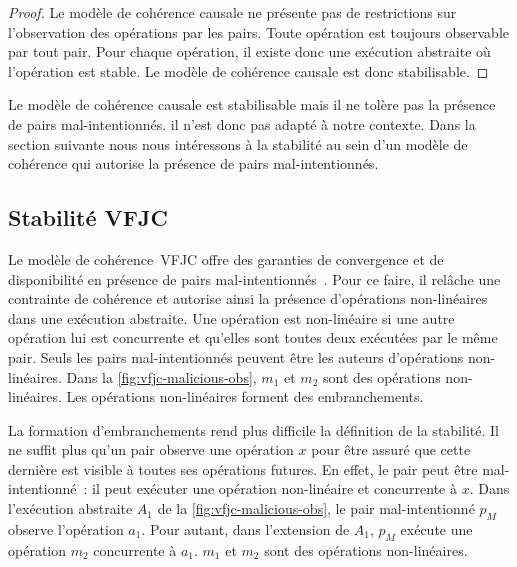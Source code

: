 \begin{proof}
Le modèle de cohérence causale ne présente pas de restrictions sur l'observation des opérations par les pairs.
Toute opération est toujours observable par tout pair.
Pour chaque opération, il existe donc une exécution abstraite où l'opération est stable.
Le modèle de cohérence causale est donc stabilisable.
\end{proof}

Le modèle de cohérence causale est stabilisable mais il ne tolère pas la présence de pairs mal-intentionnés.
il n'est donc pas adapté à notre contexte.
Dans la section suivante nous nous intéressons à la stabilité au sein d'un modèle de cohérence qui autorise la présence de pairs mal-intentionnés.


\subsection{Stabilité \acl{VFJC}}\label{subsec:vfjcs}

Le modèle de cohérence~\acf{VFJC} offre des garanties de convergence et de disponibilité en présence de pairs mal-intentionnés~\autocite{mahajan_2011_cac}.
Pour ce faire, il relâche une contrainte de cohérence et autorise ainsi la présence d'opérations non-linéaires dans une exécution abstraite.
Une opération est non-linéaire si une autre opération lui est concurrente et qu'elles sont toutes deux exécutées par le même pair.
Seuls les pairs mal-intentionnés peuvent être les auteurs d'opérations non-linéaires.
Dans la \autoref{fig:vfjc-malicious-obs}, $m_1$ et $m_2$ sont des opérations non-linéaires.
Les opérations non-linéaires forment des embranchements.

La formation d'embranchements rend plus difficile la définition de la stabilité.
Il ne suffit plus qu'un pair observe une opération $x$ pour être assuré que cette dernière est visible à toutes ses opérations futures.
En effet, le pair peut être mal-intentionné~: il peut exécuter une opération non-linéaire et concurrente à $x$.
Dans l'exécution abstraite $A_1$ de la \autoref{fig:vfjc-malicious-obs}, le pair mal-intentionné $p_M$ observe l'opération $a_1$.
Pour autant, dans l'extension de $A_1$, $p_M$ exécute une opération $m_2$ concurrente à $a_1$. $m_1$ et $m_2$ sont des opérations non-linéaires.

